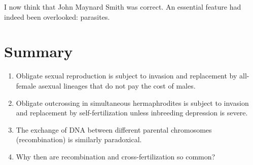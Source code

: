 \documentclass[
  letterpaper,
]{book}
\providecommand{\tightlist}{%
  \setlength{\itemsep}{0pt}\setlength{\parskip}{0pt}}\usepackage{longtable,booktabs,array}
\begin{document}
I now think that John Maynard Smith was correct. An essential feature
had indeed been overlooked: parasites.

\hypertarget{summary}{%
\section{Summary}\label{summary}}

\begin{enumerate}
\def\labelenumi{\arabic{enumi}.}
\tightlist
\item
  Obligate sexual reproduction is subject to invasion and replacement by
  all-female asexual lineages that do not pay the cost of males.
\item
  Obligate outcrossing in simultaneous hermaphrodites is subject to
  invasion and replacement by self-fertilization unless inbreeding
  depression is severe.
\item
  The exchange of DNA between different parental chromosomes
  (recombination) is similarly paradoxical.
\item
  Why then are recombination and cross-fertilization so common?
\end{enumerate}
\end{document}
